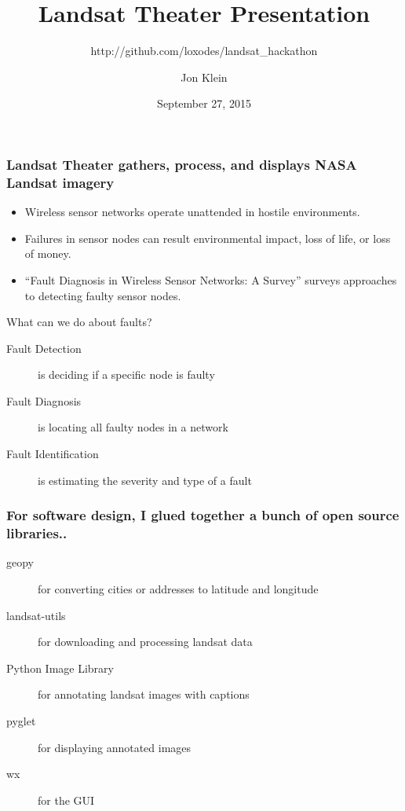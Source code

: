 \documentclass{beamer}
\title{Landsat Theater Presentation}
\subtitle{http://github.com/loxodes/landsat\_hackathon}
\author{Jon Klein}
\institute{University of Alaska, Fairbanks}
\date{September 27, 2015}
\begin{document}
    \begin{frame}
        \titlepage
    \end{frame}

    \begin{frame}
        \frametitle{Landsat Theater gathers, process, and displays NASA Landsat imagery}
        \begin{itemize}
            \item Wireless sensor networks operate unattended in hostile environments.
            \item Failures in sensor nodes can result environmental impact, loss of life, or loss of money. 
            \item ``Fault Diagnosis in Wireless Sensor Networks: A Survey'' surveys approaches to detecting faulty sensor nodes.
        \end{itemize}

        \begin{block}{What can we do about faults?}
            \begin{description}
                \item[Fault Detection] is deciding if a specific node is faulty
                \item[Fault Diagnosis] is locating all faulty nodes in a network
                \item[Fault Identification] is estimating the severity and type of a fault
            \end{description}
        \end{block}

    \end{frame}
 
    \begin{frame}
        \frametitle{For software design, I glued together a bunch of open source libraries..}
        \begin{description}
            \item[geopy] for converting cities or addresses to latitude and longitude
            \item[landsat-utils] for downloading and processing landsat data
            \item[Python Image Library] for annotating landsat images with captions
            \item[pyglet] for displaying annotated images
            \item[wx] for the GUI
        \end{description}
    \end{frame}
 
\end{document}
